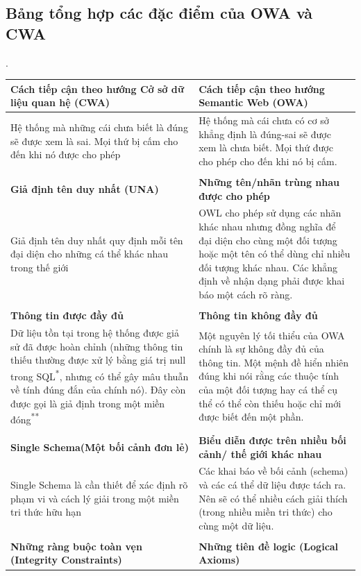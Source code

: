 \subsection{Bảng tổng hợp các đặc điểm của OWA và CWA \cite{OWA_CWA}} \cite{ianhorrock1}.
\begin{longtable}{ p{7cm} p{7cm} }
\textbf{Cách tiếp cận theo hướng Cở sở dữ liệu quan hệ (CWA)} &\textbf{ Cách tiếp cận theo hướng Semantic Web (OWA)}\\
\hline
Hệ thống mà những cái chưa biết là đúng sẽ được xem là sai. Mọi thứ bị cấm cho đến khi nó được cho phép & Hệ thống mà cái chưa có cơ sở khẳng định là đúng-sai sẽ được xem là chưa biết. Mọi thứ được cho phép cho đến khi nó bị cấm.
\\
&
\\
\textbf{Giả định tên duy nhất (UNA)} & \textbf{Những tên/nhãn trùng nhau được cho phép}
\\
Giả định tên duy nhất quy định mỗi tên đại diện cho những cá thể khác nhau trong thế giới & OWL cho phép sử dụng các nhãn khác nhau nhưng đồng nghĩa để đại diện cho cùng một đối tượng hoặc một tên có thể dùng chỉ nhiều đối tượng khác nhau. Các khẳng định về nhận dạng phải được khai báo một cách rõ ràng.
\\
&
\\
\textbf{Thông tin được đầy đủ} & \textbf{Thông tin không đầy đủ}
\\
Dữ liệu tồn tại trong hệ thống được giả sử đã được hoàn chỉnh (những thông tin thiếu thường được xử lý bằng giá trị null trong SQL\textsuperscript{*}, nhưng có thể gây mâu thuẫn về tính đúng đắn của chính nó). Đây còn được gọi là giả định trong một miền đóng\textsuperscript{**} & Một nguyên lý tối thiểu của OWA chính là sự không đầy đủ của thông tin. Một mệnh đề hiển nhiên đúng khi nói rằng các thuộc tính của một đối tượng hay cá thể cụ thể có thể còn thiếu hoặc chỉ mới được biết đến một phần.
\\
&
\\
\textbf{Single Schema(Một bối cảnh đơn lẻ)} & \textbf{Biểu diễn được trên nhiều bối cảnh/ thế giới khác nhau}
\\
Single Schema là cần thiết để xác định rõ phạm vi và cách lý giải trong một miền tri thức hữu hạn & Các khai báo về bối cảnh (schema) và các cá thể dữ liệu được tách ra. Nên sẽ có thể nhiều cách giải thích (trong nhiều miền tri thức) cho cùng một dữ liệu.
\\
&
\\
\textbf{Những ràng buộc toàn vẹn (Integrity Constraints)}
&
\textbf{Những tiên đề logic (Logical Axioms)}

\end{longtable}
